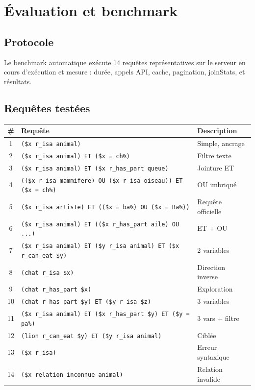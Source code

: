 \chapter{Évaluation et benchmark}
\label{chap:eval}

\section{Protocole}

Le benchmark automatique exécute 14 requêtes représentatives sur le serveur en cours d'exécution et mesure : durée, appels API, cache, pagination, joinStats, et résultats.

\section{Requêtes testées}

\begin{longtable}{cll}
    \toprule
    \# & Requête & Description \\
    \midrule
    1 & \texttt{(\$x r\_isa animal)} & Simple, ancrage \\
    2 & \texttt{(\$x r\_isa animal) ET (\$x = ch\%)} & Filtre texte \\
    3 & \texttt{(\$x r\_isa animal) ET (\$x r\_has\_part queue)} & Jointure ET \\
    4 & \texttt{((\$x r\_isa mammifere) OU (\$x r\_isa oiseau)) ET (\$x = ch\%)} & OU imbriqué \\
    5 & \texttt{(\$x r\_isa artiste) ET ((\$x = ba\%) OU (\$x = Ba\%))} & Requête officielle \\
    6 & \texttt{(\$x r\_isa animal) ET ((\$x r\_has\_part aile) OU ...)} & ET + OU \\
    7 & \texttt{(\$x r\_isa animal) ET (\$y r\_isa animal) ET (\$x r\_can\_eat \$y)} & 2 variables \\
    8 & \texttt{(chat r\_isa \$x)} & Direction inverse \\
    9 & \texttt{(chat r\_has\_part \$x)} & Exploration \\
    10 & \texttt{(chat r\_has\_part \$y) ET (\$y r\_isa \$z)} & 3 variables \\
    11 & \texttt{(\$x r\_isa animal) ET (\$x r\_has\_part \$y) ET (\$y = pa\%)} & 3 vars + filtre \\
    12 & \texttt{(lion r\_can\_eat \$y) ET (\$y r\_isa animal)} & Ciblée \\
    13 & \texttt{(\$x r\_isa)} & Erreur syntaxique \\
    14 & \texttt{(\$x relation\_inconnue animal)} & Relation invalide \\
    \bottomrule
\end{longtable}


